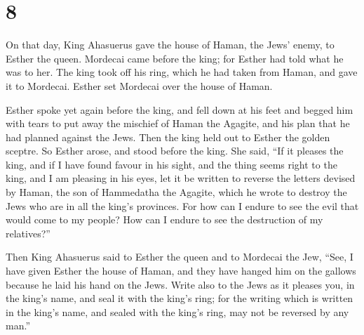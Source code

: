 \hypertarget{section-7}{%
\section{8}\label{section-7}}

 On that day, King Ahasuerus gave the house of Haman, the
Jews' enemy, to Esther the queen. Mordecai came before the king; for
Esther had told what he was to her.  The king took off his
ring, which he had taken from Haman, and gave it to Mordecai. Esther set
Mordecai over the house of Haman.

 Esther spoke yet again before the king, and fell down at
his feet and begged him with tears to put away the mischief of Haman the
Agagite, and his plan that he had planned against the Jews. 
Then the king held out to Esther the golden sceptre. So Esther arose,
and stood before the king.  She said, ``If it pleases the
king, and if I have found favour in his sight, and the thing seems right
to the king, and I am pleasing in his eyes, let it be written to reverse
the letters devised by Haman, the son of Hammedatha the Agagite, which
he wrote to destroy the Jews who are in all the king's provinces.
 For how can I endure to see the evil that would come to my
people? How can I endure to see the destruction of my relatives?''

 Then King Ahasuerus said to Esther the queen and to
Mordecai the Jew, ``See, I have given Esther the house of Haman, and
they have hanged him on the gallows because he laid his hand on the
Jews.  Write also to the Jews as it pleases you, in the
king's name, and seal it with the king's ring; for the writing which is
written in the king's name, and sealed with the king's ring, may not be
reversed by any man.''

